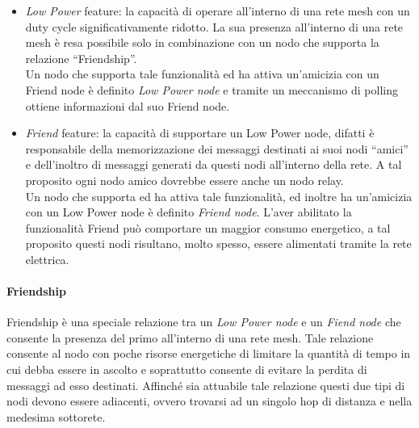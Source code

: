 \begin{itemize}
    \item \textit{Low Power} feature: la capacità di operare all'interno di una rete mesh con un duty cycle significativamente ridotto. La sua presenza all'interno di una rete mesh è resa possibile solo in combinazione con un nodo che supporta la relazione ``Friendship''.\\
    Un nodo che supporta tale funzionalità ed ha attiva un'amicizia con un Friend node è definito \textit{Low Power node} e tramite un meccanismo di polling ottiene informazioni dal suo Friend node.
    
    \item \textit{Friend} feature: la capacità di supportare un Low Power node, difatti è responsabile della memorizzazione dei messaggi destinati ai suoi nodi ``amici'' e dell'inoltro di messaggi generati da questi nodi all'interno della rete. A tal proposito ogni nodo amico dovrebbe essere anche un nodo relay.\\
    Un nodo che supporta ed ha attiva tale funzionalità, ed inoltre ha un'amicizia con un Low Power node è definito \textit{Friend node}. L'aver abilitato la funzionalità Friend può comportare un maggior consumo energetico, a tal proposito questi nodi risultano, molto spesso, essere alimentati tramite la rete elettrica.
\end{itemize}

\paragraph{Friendship}
Friendship è una speciale relazione tra un \textit{Low Power node} e un \textit{Fiend node} che consente la presenza del primo all'interno di una rete mesh. Tale relazione consente al nodo con poche risorse energetiche di limitare la quantità di tempo in cui debba essere in ascolto e soprattutto consente di evitare la perdita di messaggi ad esso destinati. Affinché sia attuabile tale relazione questi due tipi di nodi devono essere adiacenti, ovvero trovarsi ad un singolo hop di distanza e nella medesima sottorete.\\

